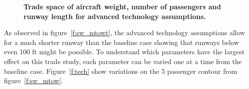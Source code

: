 \documentclass[]{aiaa-tc}%
\begin{document}
\begin{figure}[h!]
 \begin{subfigmatrix}{2}%
 \end{subfigmatrix}
    \caption{\textbf{Trade space of aircraft weight, number of passengers and runway length for advanced technology assumptions.}}
 \label{f:sw_mtt}
\end{figure}

As observed in figure~\ref{f:sw_mtowt}, the advanced technology assumptions allow for a much shorter runway than the baseline case showing that runways below even 100 ft might be possible. 
To understand which parameters have the largest effect on this trade study, each parameter can be varied one at a time from the baseline case. 
Figure~\ref{f:tech} show variations on the 5 passenger contour from figure~\ref{f:sw_mtow}. 
\end{document}
